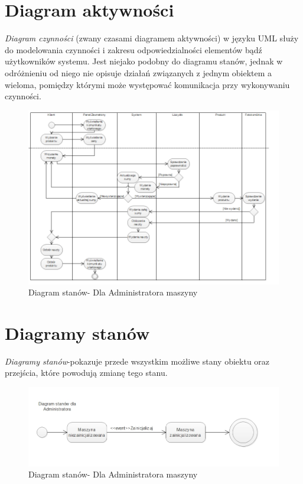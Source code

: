 \documentclass[a4paper, 11pt]{article}
\begin{document}
\section{Diagram aktywności}
\emph{Diagram czynności} (zwany czasami diagramem aktywności) w języku UML służy do modelowania czynności i zakresu odpowiedzialności elementów bądź użytkowników systemu. Jest niejako podobny do diagramu stanów, jednak w odróżnieniu od niego nie opisuje działań związanych z jednym obiektem a wieloma, pomiędzy którymi może występować komunikacja przy wykonywaniu czynności.
\begin{figure}[H]
\centerline{\includegraphics[scale=0.9]{../Diagrams/diagramAktywnosci2}}
\caption{Diagram stanów- Dla Administratora maszyny}
\end{figure}
\section{Diagramy stanów}
\emph{Diagramy stanów}-pokazuje przede wszystkim możliwe stany obiektu oraz przejścia, które powodują zmianę tego stanu.
\begin{figure}[H]
\centerline{\includegraphics[scale=0.9]{../Diagrams/stanyAdmin}}
\caption{Diagram stanów- Dla Administratora maszyny}
\end{figure}
\end{document}

